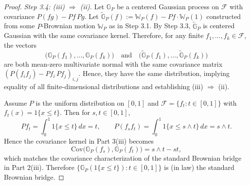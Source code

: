 \documentclass[12pt]{article}
\renewcommand{\(}{\left(}%
\renewcommand{\)}{\right)}%
\renewcommand{\[}{\left[}%
\renewcommand{\]}{\right]}%
\newtheorem{proof}{Proof.}}
\begin{document}
\begin{proof}
\emph{Step 3.4: (iii) $\Rightarrow$ (ii).}
Let $\mathbb G_P$ be a centered Gaussian process on $\mathcal F$ with covariance $P(fg)-Pf\,Pg$. Let $\widetilde{\mathbb G}_P(f):=\mathbb W_P(f)-Pf\cdot\mathbb W_P(1)$ constructed from some $P$-Brownian motion $\mathbb W_P$ as in Step 3.1. By Step 3.3, $\widetilde{\mathbb G}_P$ is centered Gaussian with the same covariance kernel. Therefore, for any finite $f_1,\dots,f_k\in\mathcal F$, the vectors
\begin{equation*}
\big(\mathbb G_P(f_1),\dots,\mathbb G_P(f_k)\big)
\quad\text{and}\quad
\big(\widetilde{\mathbb G}_P(f_1),\dots,\widetilde{\mathbb G}_P(f_k)\big)
\end{equation*}
are both mean-zero multivariate normal with the same covariance matrix $(P(f_if_j)-Pf_i\,Pf_j)_{i,j}$. Hence, they have the same distribution, implying equality of all finite-dimensional distributions and establishing (iii) $\Rightarrow$ (ii). 

\medskip
Assume $P$ is the uniform distribution on $[0,1]$ and $\mathcal F=\{f_t:t\in[0,1]\}$ with $f_t(x)=1\{x\le t\}$. Then for $s,t\in[0,1]$,
\begin{equation*}
Pf_t=\int_0^1 1\{x\le t\}\,dx=t,
\qquad
P(f_sf_t)=\int_0^1 1\{x\le s\wedge t\}\,dx=s\wedge t.
\end{equation*}
Hence the covariance kernel in Part 3(iii) becomes
\begin{equation*}
\mathrm{Cov}\big(\mathbb G_P(f_s),\mathbb G_P(f_t)\big)=s\wedge t-st,
\end{equation*}
which matches the covariance characterization of the standard Brownian bridge in Part 2(iii). Therefore $\{\mathbb G_P(1\{x\le t\}):t\in[0,1]\}$ is (in law) the standard Brownian bridge.
\end{proof}
\end{document}
